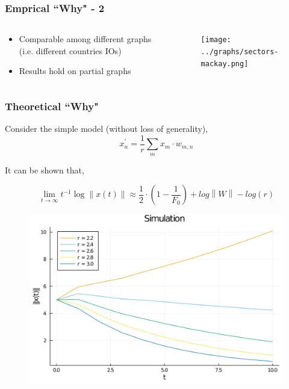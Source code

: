 \documentclass{beamer}
\newcommand{\norm}[1]{\left\lVert#1\right\rVert}
\begin{document}
\begin{frame}
    \frametitle{Emprical ``Why" - 2}
    \begin{columns}
        \begin{column}{.3\textwidth}
            \begin{itemize}
                \item Comparable among different graphs (i.e. different countries IOs)
                \item Results hold on partial graphs
            \end{itemize}
        \end{column}
        \begin{column}{.69\textwidth}
            \begin{figure}
                \texttt{[image: ../graphs/sectors-mackay.png]}
            \end{figure}
        \end{column}
    \end{columns}
\end{frame}

\begin{frame}
    \frametitle{Theoretical ``Why"}
    Consider the simple model (without loss of generality),
    \begin{equation*}
        x_n^\prime =\frac{1}{r} \sum_{m} x_m\cdot w_{m, n}
    \end{equation*}

    It can be shown that,

    \begin{equation*}
        \lim_{t \xrightarrow{} \infty} t^{-1} \log \norm{x(t)} \approx\frac{1}{2} \cdot \left( 1 - \frac{1}{F_0}\right) + log \norm{W} - log(r)
    \end{equation*}


    \begin{figure}
        \includegraphics[width=\linewidth,height=0.4\textheight,keepaspectratio]{../../plots/presentations/dynamics.png}
    \end{figure}
\end{frame}
\end{document}
